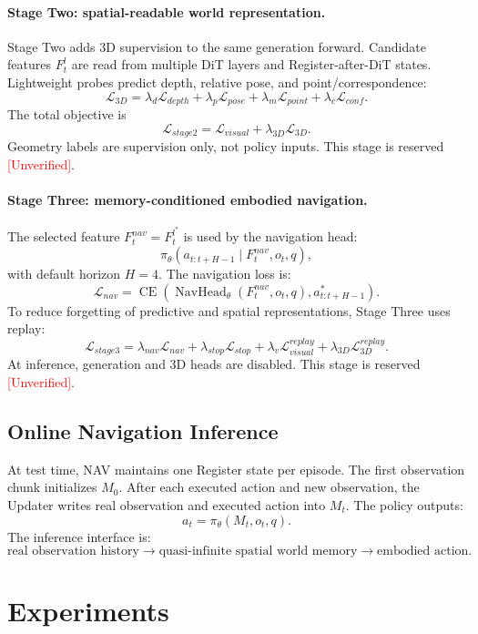 \documentclass[11pt,a4paper]{ctexart}
\newcommand{\method}{NAV}
\newcommand{\unverified}{\textcolor{red}{[Unverified]}}
\begin{document}
\paragraph{Stage Two: spatial-readable world representation.}
Stage Two adds 3D supervision to the same generation forward. Candidate features \(F_t^l\) are read from multiple DiT layers and Register-after-DiT states. Lightweight probes predict depth, relative pose, and point/correspondence:
\[
\mathcal{L}_{3D}
=
\lambda_d \mathcal{L}_{depth}
+ \lambda_p \mathcal{L}_{pose}
+ \lambda_m \mathcal{L}_{point}
+ \lambda_c \mathcal{L}_{conf}.
\]
The total objective is
\[
\mathcal{L}_{stage2}
=
\mathcal{L}_{visual}
+ \lambda_{3D}\mathcal{L}_{3D}.
\]
Geometry labels are supervision only, not policy inputs. This stage is reserved \unverified{}.

\paragraph{Stage Three: memory-conditioned embodied navigation.}
The selected feature \(F_t^{nav}=F_t^{l^\ast}\) is used by the navigation head:
\[
\pi_\theta(a_{t:t+H-1} \mid F_t^{nav}, o_t, q),
\]
with default horizon \(H=4\). The navigation loss is:
\[
\mathcal{L}_{nav}
=
\operatorname{CE}
\left(
\operatorname{NavHead}_\theta(F_t^{nav}, o_t, q),
a^\ast_{t:t+H-1}
\right).
\]
To reduce forgetting of predictive and spatial representations, Stage Three uses replay:
\[
\mathcal{L}_{stage3}
=
\lambda_{nav}\mathcal{L}_{nav}
+ \lambda_{stop}\mathcal{L}_{stop}
+ \lambda_v\mathcal{L}_{visual}^{replay}
+ \lambda_{3D}\mathcal{L}_{3D}^{replay}.
\]
At inference, generation and 3D heads are disabled. This stage is reserved \unverified{}.

\subsection{Online Navigation Inference}

At test time, \method{} maintains one Register state per episode. The first observation chunk initializes \(M_0\). After each executed action and new observation, the Updater writes real observation and executed action into \(M_t\). The policy outputs:
\[
a_t = \pi_\theta(M_t, o_t, q).
\]
The inference interface is:
\[
\text{real observation history}
\rightarrow
\text{quasi-infinite spatial world memory}
\rightarrow
\text{embodied action}.
\]

\section{Experiments}
\end{document}
